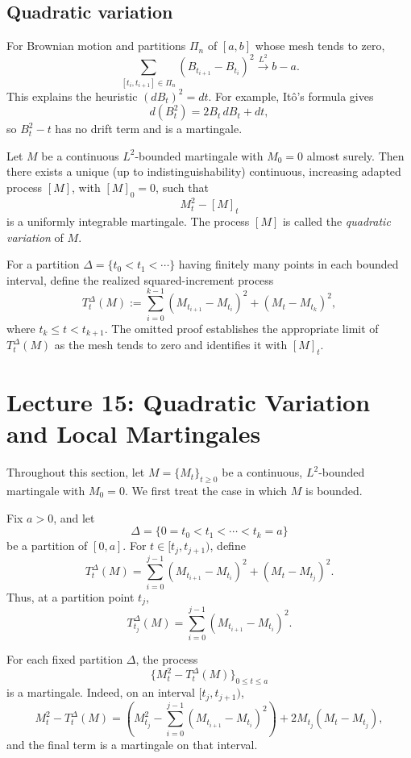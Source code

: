 \subsection*{Quadratic variation}
For Brownian motion and partitions $\Pi_n$ of $[a,b]$ whose mesh tends to
zero,
\[
 \sum_{[t_i,t_{i+1}]\in\Pi_n}(B_{t_{i+1}}-B_{t_i})^2
 \xrightarrow{L^2} b-a.
\]
This explains the heuristic $(dB_t)^2=dt$. For example, It\^o's formula
gives
\[
 d(B_t^2)=2B_t\,dB_t+dt,
\]
so $B_t^2-t$ has no drift term and is a martingale.

\begin{theorem}
Let $M$ be a continuous $L^2$-bounded martingale with $M_0=0$ almost surely.
Then there exists a unique (up to indistinguishability) continuous,
increasing adapted process $[M]$, with $[M]_0=0$, such that
\[
 M_t^2-[M]_t
\]
is a uniformly integrable martingale. The process $[M]$ is called the
\emph{quadratic variation} of $M$.
\end{theorem}

For a partition $\Delta=\{t_0<t_1<\cdots\}$ having finitely many points in
each bounded interval, define the realized squared-increment process
\[
 T_t^\Delta(M)
 :=\sum_{i=0}^{k-1}(M_{t_{i+1}}-M_{t_i})^2+(M_t-M_{t_k})^2,
\]
where $t_k\le t<t_{k+1}$. The omitted proof establishes the appropriate
limit of $T_t^\Delta(M)$ as the mesh tends to zero and identifies it with
$[M]_t$.
\section{Lecture 15: Quadratic Variation and Local Martingales}

Throughout this section, let \(M=\{M_t\}_{t\ge 0}\) be a continuous, \(L^2\)-bounded martingale with \(M_0=0\). We first treat the case in which \(M\) is bounded.

Fix \(a>0\), and let
\[
\Delta=\{0=t_0<t_1<\cdots<t_k=a\}
\]
be a partition of \([0,a]\). For \(t\in[t_j,t_{j+1})\), define
\[
T_t^\Delta(M)
=
\sum_{i=0}^{j-1}(M_{t_{i+1}}-M_{t_i})^2
+
(M_t-M_{t_j})^2.
\]
Thus, at a partition point \(t_j\),
\[
T_{t_j}^\Delta(M)
=
\sum_{i=0}^{j-1}(M_{t_{i+1}}-M_{t_i})^2.
\]

For each fixed partition \(\Delta\), the process
\[
\{M_t^2-T_t^\Delta(M)\}_{0\le t\le a}
\]
is a martingale. Indeed, on an interval \([t_j,t_{j+1})\),
\[
M_t^2-T_t^\Delta(M)
=
\left(M_{t_j}^2-\sum_{i=0}^{j-1}(M_{t_{i+1}}-M_{t_i})^2\right)
+
2M_{t_j}(M_t-M_{t_j}),
\]
and the final term is a martingale on that interval.

